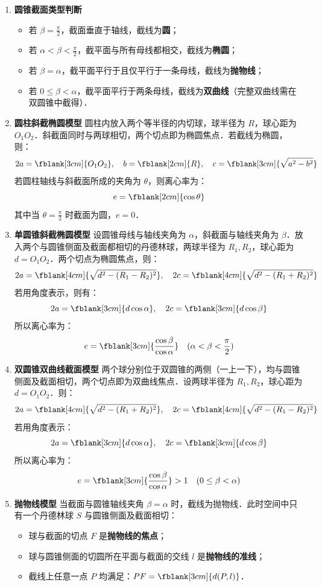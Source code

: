 \documentclass[11pt,a4paper]{ctexart}
\begin{document}
\begin{enumerate}[label=(\arabic*), leftmargin=2em, itemsep=0.3em]
  \item \textbf{圆锥截面类型判断}
    \begin{itemize}[itemsep=0.15em]
      \item 若 $\beta = \frac{\pi}{2}$，截面垂直于轴线，截线为\textbf{圆}；
      \item 若 $\alpha < \beta < \frac{\pi}{2}$，截平面与所有母线都相交，截线为\textbf{椭圆}；
      \item 若 $\beta = \alpha$，截平面平行于且仅平行于一条母线，截线为\textbf{抛物线}；
      \item 若 $0 \le \beta < \alpha$，截平面平行于两条母线，截线为\textbf{双曲线}（完整双曲线需在双圆锥中截得）．
    \end{itemize}

  \item \textbf{圆柱斜截椭圆模型}
    圆柱内放入两个等半径的内切球，球半径为 $R$，球心距为 $O_1O_2$．斜截面同时与两球相切，两个切点即为椭圆焦点．若截线为椭圆，则：
    \[ 2a = \fblank[3cm]{O_1O_2},\quad b = \fblank[2cm]{R},\quad c = \fblank[3cm]{\sqrt{a^2 - b^2}} \]
    若圆柱轴线与斜截面所成的夹角为 $\theta$，则离心率为：
    \[ e = \fblank[2cm]{\cos\theta} \]
    其中当 $\theta = \frac{\pi}{2}$ 时截面为圆，$e = 0$．

  \item \textbf{单圆锥斜截椭圆模型}
    设圆锥母线与轴线夹角为 $\alpha$，斜截面与轴线夹角为 $\beta$．放入两个与圆锥侧面及截面都相切的丹德林球，两球半径为 $R_1, R_2$，球心距为 $d = O_1O_2$．两个切点为椭圆焦点，则：
    \[ 2a = \fblank[4cm]{\sqrt{d^2 - (R_1 - R_2)^2}},\quad 2c = \fblank[4cm]{\sqrt{d^2 - (R_1 + R_2)^2}} \]
    若用角度表示，则有：
    \[ 2a = \fblank[3cm]{d\cos\alpha},\quad 2c = \fblank[3cm]{d\cos\beta} \]
    所以离心率为：
    \[ e = \fblank[3cm]{\frac{\cos\beta}{\cos\alpha}} \quad (\alpha < \beta < \frac{\pi}{2}) \]

  \item \textbf{双圆锥双曲线截面模型}
    两个球分别位于双圆锥的两侧（一上一下），均与圆锥侧面及截面相切，两个切点即为双曲线焦点．设两球半径为 $R_1, R_2$，球心距为 $d = O_1O_2$．则：
    \[ 2a = \fblank[4cm]{\sqrt{d^2 - (R_1 + R_2)^2}},\quad 2c = \fblank[4cm]{\sqrt{d^2 - (R_1 - R_2)^2}} \]
    若用角度表示：
    \[ 2a = \fblank[3cm]{d\cos\alpha},\quad 2c = \fblank[3cm]{d\cos\beta} \]
    所以离心率为：
    \[ e = \fblank[3cm]{\frac{\cos\beta}{\cos\alpha}} > 1 \quad (0 \le \beta < \alpha) \]

  \item \textbf{抛物线模型}
    当截面与圆锥轴线夹角 $\beta = \alpha$ 时，截线为抛物线．此时空间中只有一个丹德林球 $S$ 与圆锥侧面及截面相切：
    \begin{itemize}[itemsep=0.15em]
      \item 球与截面的切点 $F$ 是\textbf{抛物线的焦点}；
      \item 球与圆锥侧面的切圆所在平面与截面的交线 $l$ 是\textbf{抛物线的准线}；
      \item 截线上任意一点 $P$ 均满足：$PF = \fblank[3cm]{d(P, l)}$．
    \end{itemize}
\end{enumerate}
\end{document}
